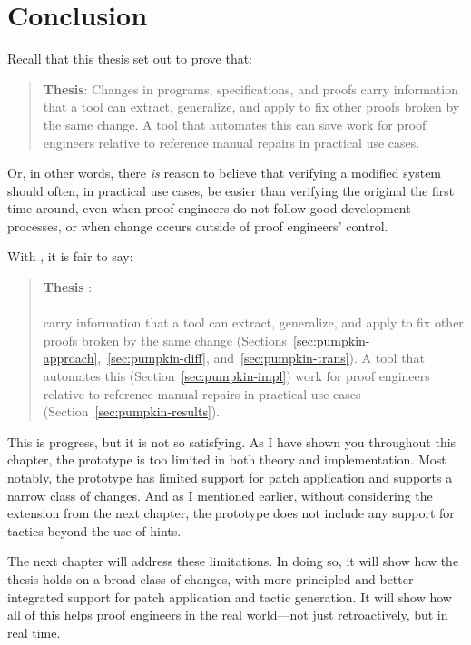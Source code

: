 \section{Conclusion}
\label{sec:pumpkin-concl}

Recall that this thesis set out to prove that:

\begin{quote}
\textbf{Thesis}: Changes in programs, specifications, and proofs carry information that a tool can extract, generalize, and apply to fix other proofs broken by the same change. A tool that automates this can save work for proof engineers relative to reference manual repairs in practical use cases.
\end{quote}
Or, in other words, there \textit{is} reason to believe that verifying a modified system should often, in practical use cases, be easier than verifying the original the first time around,
even when proof engineers do not follow good development processes,
or when change occurs outside of proof engineers' control.

With \sysname, it is fair to say:

\begin{quote}
\textbf{Thesis }:  \\
 \\
 carry information that a tool can extract, generalize, and  apply to fix other proofs broken by the same change (Sections~\ref{sec:pumpkin-approach},~\ref{sec:pumpkin-diff}, and~\ref{sec:pumpkin-trans}). A tool that automates this (Section~\ref{sec:pumpkin-impl})  work for proof engineers relative to reference manual repairs in  practical use cases (Section~\ref{sec:pumpkin-results}).
\end{quote}
This is progress, but it is not so satisfying.
As I have shown you throughout this chapter, the \sysname prototype is too limited in both theory and implementation.
Most notably, the \sysname prototype has limited support for patch application and supports
a narrow class of changes.
And as I mentioned earlier, without considering the extension from the next chapter, 
the \sysname prototype does not include any support for tactics beyond the use of hints.

The next chapter will address these limitations.
In doing so, it will show how the thesis holds on a broad class of changes,
with more principled and better integrated support for patch application and tactic generation.
It will show how all of this helps proof engineers in the real world---not just retroactively,
but in real time.





